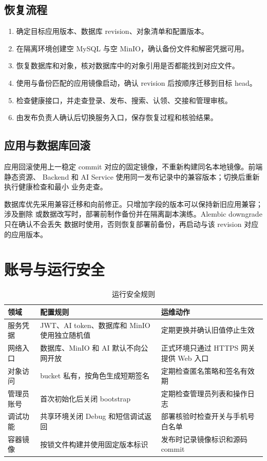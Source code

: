 \subsection{恢复流程}

\begin{enumerate}
  \item 确定目标应用版本、数据库 revision、对象清单和配置版本。
  \item 在隔离环境创建空 MySQL 与空 MinIO，确认备份文件和解密凭据可用。
  \item 恢复数据库和对象，核对数据库中的对象引用是否都能找到对应文件。
  \item 使用与备份匹配的应用镜像启动，确认 revision 后按顺序迁移到目标 head。
  \item 检查健康接口，并走查登录、发布、搜索、认领、交接和管理审核。
  \item 由发布负责人确认后切换服务入口，保存恢复过程和核验结果。
\end{enumerate}

\subsection{应用与数据库回滚}

应用回滚使用上一稳定 commit 对应的固定镜像，不重新构建同名本地镜像。前端静态资源、
Backend 和 AI Service 使用同一发布记录中的兼容版本；切换后重新执行健康检查和最小
业务走查。

数据库优先采用兼容迁移和向前修正。只增加字段的版本可以保持新旧应用兼容；涉及删除
或数据改写时，部署前制作备份并在隔离副本演练。Alembic downgrade 只在确认不会丢失
数据时使用，否则恢复部署前备份，再启动与该 revision 对应的应用版本。

\section{账号与运行安全}

\begin{table}[H]
  \centering
  \caption{运行安全规则}
  \begin{tabularx}{\textwidth}{L{3.0cm}Y Y}
    \toprule
    领域 & 配置规则 & 运维动作 \\
    \midrule
    服务凭据 & JWT、AI token、数据库和 MinIO 使用独立随机值 & 定期更换并确认旧值停止生效 \\
    网络入口 & 数据库、MinIO 和 AI 默认不向公网开放 & 正式环境只通过 HTTPS 网关提供 Web 入口 \\
    对象访问 & bucket 私有，按角色生成短期签名 & 定期检查匿名策略和签名有效期 \\
    管理员账号 & 首次初始化后关闭 bootstrap & 定期检查管理员列表和操作日志 \\
    调试功能 & 共享环境关闭 Debug 和短信调试返回 & 部署核验时检查开关与手机号白名单 \\
    容器镜像 & 按锁文件构建并使用固定版本标识 & 发布时记录镜像标识和源码 commit \\
    \bottomrule
  \end{tabularx}
\end{table}

